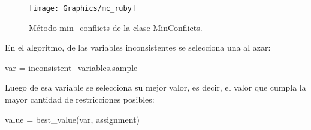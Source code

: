 \begin{figure}[h]
	\begin{center}
		\texttt{[image: Graphics/mc\_ruby]}
		\caption{M\'etodo \textsf{min\_conflicts} de la clase \textsf{MinConflicts}.}
		\label{mc_ruby}
	\end{center}	
\end{figure}

En el algoritmo, de las variables inconsistentes se selecciona una al azar:
\begin{center}	\textsf{var = inconsistent\_variables.sample}	\end{center}

Luego de esa variable se selecciona su mejor valor, es decir, el valor que cumpla la mayor cantidad de restricciones posibles:
\begin{center}	\textsf{value = best\_value(var, assignment)}	\end{center}

